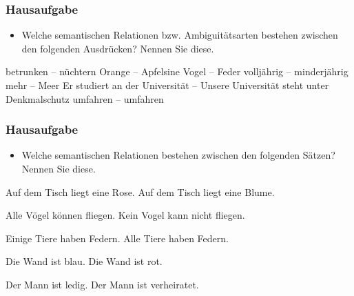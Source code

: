 \begin{frame}
	\frametitle{Hausaufgabe}
	
\begin{itemize}
	\item Welche semantischen Relationen bzw. Ambiguitätsarten bestehen zwischen den folgenden Ausdrücken? Nennen Sie diese.
\end{itemize}

\ea 
	\ea \label{ex:07HA1} betrunken -- nüchtern
	\ex \label{ex:07HA2} Orange -- Apfelsine
	\ex \label{ex:07HA3} Vogel -- Feder
	\ex \label{ex:07HA4} volljährig -- minderjährig
	\ex \label{ex:07HA5} mehr -- Meer
	\ex \label{ex:07HA12} Er studiert an der Universität -- Unsere Universität steht unter Denkmalschutz
	\ex \label{ex:07HA13} umfahren -- umfahren
	\z 	
\z 
\end{frame}


\begin{frame}
	\frametitle{Hausaufgabe}
	
	\begin{itemize}
		\item Welche semantischen Relationen bestehen zwischen den folgenden Sätzen? Nennen Sie diese.
	\end{itemize}

\ea
	\ea \label{ex:07HA6} Auf dem Tisch liegt eine Rose.
	\ex \label{ex:07HA7} Auf dem Tisch liegt eine Blume.
\z
	
\ex
	\ea \label{ex:07HA8} Alle Vögel können fliegen.
	\ex \label{ex:07HA9} Kein Vogel kann nicht fliegen.
\z
	
\ex
	\ea \label{ex:07HA10} Einige Tiere haben Federn.
	\ex \label{ex:07HA11} Alle Tiere haben Federn.
\z
	
\ex
	\ea \label{ex:07HA14} Die Wand ist blau.
	\ex \label{ex:07HA15} Die Wand ist rot.
\z
	
\ex
	\ea \label{ex:07HA16} Der Mann ist ledig.
	\ex \label{ex:07HA17} Der Mann ist verheiratet.
\z
	\z 
\end{frame}


